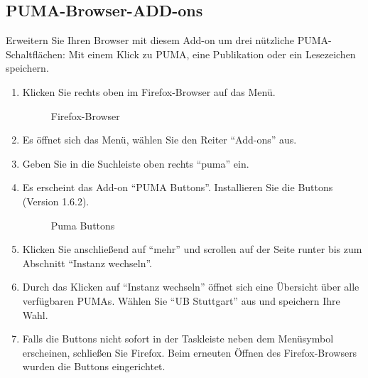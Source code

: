\subsection{PUMA-Browser-ADD-ons}
Erweitern Sie Ihren Browser mit diesem Add-on um drei nützliche PUMA-Schaltflächen: Mit einem Klick zu PUMA, eine Publikation oder ein Lesezeichen speichern.\newline
\begin{enumerate}
\item Klicken Sie rechts oben im Firefox-Browser auf das Menü.
\begin{figure}[h!]
 \centering
 \caption{Firefox-Browser}
 \label{figure3}
\end{figure} 
\item Es öffnet sich das Menü, wählen Sie den Reiter \enquote{Add-ons} aus. 
\item Geben Sie in die Suchleiste oben rechts \enquote{puma} ein.
\item Es erscheint das Add-on \enquote{PUMA Buttons}. Installieren Sie die Buttons (Version 1.6.2).
\begin{figure}[h!]
 \centering
 \caption{Puma Buttons}
 \label{figure3}
\end{figure} 
\item Klicken Sie anschließend auf \enquote{mehr} und scrollen auf der Seite runter bis zum Abschnitt \enquote{Instanz wechseln}. 
\item Durch das Klicken auf \enquote{Instanz wechseln} öffnet sich eine Übersicht über alle verfügbaren PUMAs. Wählen Sie  \enquote{UB Stuttgart} aus und speichern Ihre Wahl.
\item Falls die Buttons nicht sofort in der Taskleiste neben dem Menüsymbol  erscheinen, schließen Sie Firefox. Beim erneuten Öffnen des Firefox-Browsers wurden die Buttons eingerichtet.
\end{enumerate}
